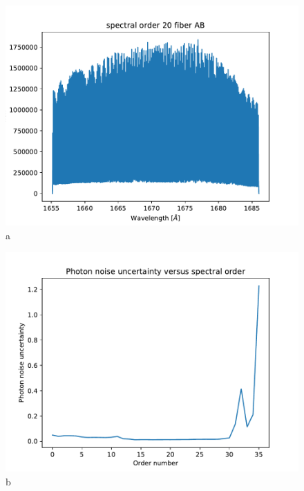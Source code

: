 \begin{figure}

\begin{center}
\begin{minipage}{.495\textwidth}
\begin{center}
\includegraphics[width=\textwidth]{Figures/cal_ccf_e2ds_1.pdf}
a
\end{center}
\end{minipage}%
\begin{minipage}{.495\textwidth}
\begin{center}
\includegraphics[width=\textwidth]{Figures/cal_ccf_e2ds_2.pdf}
b
\end{center}
\end{minipage}%
\end{center}


\end{figure}
